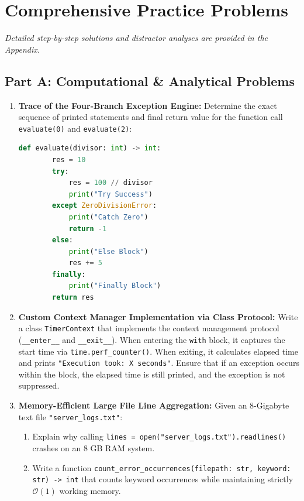 \newpage
\section{Comprehensive Practice Problems}
\textit{Detailed step-by-step solutions and distractor analyses are provided in the Appendix.}

\subsection*{Part A: Computational \& Analytical Problems}

\begin{enumerate}
    \item \textbf{Trace of the Four-Branch Exception Engine:}
    Determine the exact sequence of printed statements and final return value for the function call \texttt{evaluate(0)} and \texttt{evaluate(2)}:
    \begin{lstlisting}[language=Python]
    def evaluate(divisor: int) -> int:
        res = 10
        try:
            res = 100 // divisor
            print("Try Success")
        except ZeroDivisionError:
            print("Catch Zero")
            return -1
        else:
            print("Else Block")
            res += 5
        finally:
            print("Finally Block")
        return res
    \end{lstlisting}

    \item \textbf{Custom Context Manager Implementation via Class Protocol:}
    Write a class \texttt{TimerContext} that implements the context management protocol (\texttt{\_\_enter\_\_} and \texttt{\_\_exit\_\_}).
    When entering the \texttt{with} block, it captures the start time via \texttt{time.perf\_counter()}.
    When exiting, it calculates elapsed time and prints \texttt{"Execution took: X seconds"}. Ensure that if an exception occurs within the block, the elapsed time is still printed, and the exception is not suppressed.

    \item \textbf{Memory-Efficient Large File Line Aggregation:}
    Given an 8-Gigabyte text file \texttt{"server\_logs.txt"}:
    \begin{enumerate}
        \item Explain why calling \texttt{lines = open("server\_logs.txt").readlines()} crashes on an 8 GB RAM system.
        \item Write a function \texttt{count\_error\_occurrences(filepath: str, keyword: str) -> int} that counts keyword occurrences while maintaining strictly $\mathcal{O}(1)$ working memory.
    \end{enumerate}


\end{enumerate}
